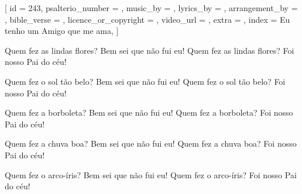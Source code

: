 
[
    id                     = {243},
    psalterio_number       = {},
    music_by               = {},
    lyrics_by              = {},
    arrangement_by         = {},
    bible_verse            = {},
    licence_or_copyright   = {},
    video_url              = {},
    extra                  = {},
    index                  = {Eu tenho um Amigo que me ama},
]


\beginverse
Quem fez as lindas  flores?
Bem sei que não fui eu!
Quem fez as lindas  flores?
Foi nosso Pai do céu!
\endverse


\beginverse
Quem fez o sol tão belo? 
Bem sei que não fui eu! 
Quem fez o sol tão belo? 
Foi nosso Pai do céu!
\endverse


\beginverse
Quem fez a borboleta? 
Bem sei que não fui eu! 
Quem fez a borboleta? 
Foi nosso Pai do céu!
\endverse



\beginverse
Quem fez a chuva boa? 
Bem sei que não fui eu! 
Quem fez a chuva boa? 
Foi nosso Pai do céu!
\endverse



\beginverse
Quem fez o arco-íris? 
Bem sei que não fui eu! 
Quem fez o arco-íris? 
Foi nosso Pai do céu!
\endverse


\endsong
